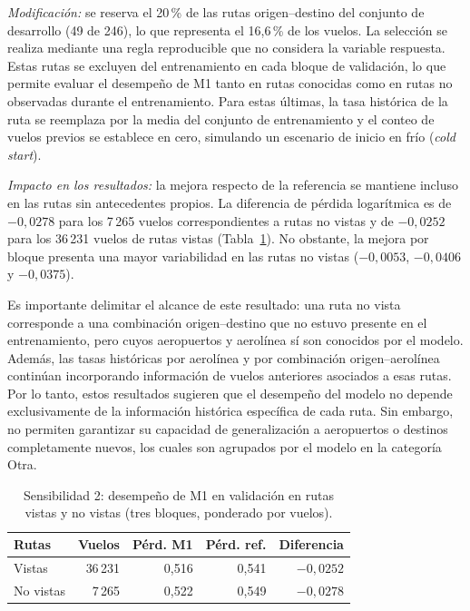 \documentclass[11pt,a4paper]{article}
\begin{document}
\begin{enumerate}[leftmargin=*]
\emph{Modificación:} se reserva el 20\,\% de las rutas origen--destino del conjunto de desarrollo (49 de 246), lo que representa el
16,6\,\% de los vuelos. La selección se realiza mediante una regla reproducible que no considera la variable respuesta. Estas rutas se
excluyen del entrenamiento en cada bloque de validación, lo que permite evaluar el desempeño de M1 tanto en rutas conocidas como en rutas
no observadas durante el entrenamiento. Para estas últimas, la tasa histórica de la ruta se reemplaza por la media del conjunto de
entrenamiento y el conteo de vuelos previos se establece en cero, simulando un escenario de inicio en frío (\emph{cold start}).
 
\emph{Impacto en los resultados:} la mejora respecto de la referencia se mantiene incluso en las rutas sin antecedentes propios. La
diferencia de pérdida logarítmica es de $-0{,}0278$ para los 7\,265 vuelos correspondientes a rutas no vistas y de $-0{,}0252$ para los
36\,231 vuelos de rutas vistas (Tabla~\ref{tab:sens2}). No obstante, la mejora por bloque presenta una mayor variabilidad en las rutas no
vistas ($-0{,}0053$, $-0{,}0406$ y $-0{,}0375$).
 
Es importante delimitar el alcance de este resultado: una ruta no vista corresponde a una combinación origen--destino que no estuvo
presente en el entrenamiento, pero cuyos aeropuertos y aerolínea sí son conocidos por el modelo. Además, las tasas históricas por
aerolínea y por combinación origen--aerolínea continúan incorporando información de vuelos anteriores asociados a esas rutas. Por lo
tanto, estos resultados sugieren que el desempeño del modelo no depende exclusivamente de la información histórica específica de cada
ruta. Sin embargo, no permiten garantizar su capacidad de generalización a aeropuertos o destinos completamente nuevos, los cuales son
agrupados por el modelo en la categoría \guillemotleft{}Otra\guillemotright{}.
\end{enumerate}
 
\begin{table}[ht]
\centering\small
\begin{tabular}{lrrrr}
\toprule
Rutas & Vuelos & Pérd. M1 & Pérd. ref. & Diferencia\\
\midrule
Vistas & 36\,231 & 0,516 & 0,541 & $-0{,}0252$\\
No vistas & 7\,265 & 0,522 & 0,549 & $-0{,}0278$\\
\bottomrule
\end{tabular}
\caption{Sensibilidad 2: desempeño de M1 en validación en rutas vistas y no vistas (tres bloques, ponderado por vuelos).}
\label{tab:sens2}
\end{table}
 
\end{document}
